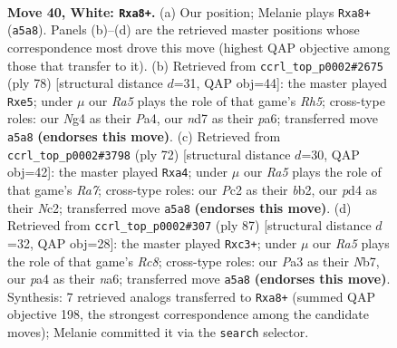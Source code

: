 \documentclass[11pt]{article}
\begin{document}
\clearpage

\begin{figure}[p]\centering
\begin{subfigure}{0.46\textwidth}\centering
\resizebox{\linewidth}{!}{%
\newchessgame
\chessboard[
  setfen={r5k1/1b1n4/8/R7/p2p2N1/P5P1/1PP5/2K5 w - - 2 40},
  showmover=false,
  pgfstyle=straightmove, color=movearrow, markmove={a5-a8}
]}
\caption{}
\end{subfigure}\hfill
\begin{subfigure}{0.46\textwidth}\centering
\resizebox{\linewidth}{!}{%
\newchessgame
\chessboard[
  setfen={8/7p/p2k4/4r2R/Pp6/6P1/5PP1/5K2 w - - 0 40},
  showmover=false,
  pgfstyle=straightmove, color=movearrow, markmove={h5-e5}
]}
\caption{}
\end{subfigure}
\\[4pt]
\begin{subfigure}{0.46\textwidth}\centering
\resizebox{\linewidth}{!}{%
\newchessgame
\chessboard[
  setfen={6k1/R7/3p2Bp/2nP4/r4p2/7P/1bN2PP1/5K2 w - - 2 37},
  showmover=false,
  pgfstyle=straightmove, color=movearrow, markmove={a7-a4}
]}
\caption{}
\end{subfigure}\hfill
\begin{subfigure}{0.46\textwidth}\centering
\resizebox{\linewidth}{!}{%
\newchessgame
\chessboard[
  setfen={8/1n2k1p1/N1p2p2/8/4PP2/2RK2P1/8/2r5 b - - 5 44},
  showmover=false,
  pgfstyle=straightmove, color=movearrow, markmove={c1-c3}
]}
\caption{}
\end{subfigure}
\caption{\textbf{Move 40, White: \texttt{Rxa8+}.} (a) Our position; Melanie plays \texttt{Rxa8+} (\texttt{a5a8}). Panels (b)--(d) are the retrieved master positions whose correspondence most drove this move (highest QAP objective among those that transfer to it). (b) Retrieved from \texttt{ccrl\_top\_p0002\#2675} (ply 78) [structural distance $d$=31, QAP obj=44]: the master played \texttt{Rxe5}; under $\mu$ our \emph{Ra5} plays the role of that game's \emph{Rh5}; cross-type roles: our \emph{N}g4 as their \emph{P}a4, our \emph{n}d7 as their \emph{p}a6; transferred move \texttt{a5a8} \textbf{(endorses this move)}. (c) Retrieved from \texttt{ccrl\_top\_p0002\#3798} (ply 72) [structural distance $d$=30, QAP obj=42]: the master played \texttt{Rxa4}; under $\mu$ our \emph{Ra5} plays the role of that game's \emph{Ra7}; cross-type roles: our \emph{P}c2 as their \emph{b}b2, our \emph{p}d4 as their \emph{N}c2; transferred move \texttt{a5a8} \textbf{(endorses this move)}. (d) Retrieved from \texttt{ccrl\_top\_p0002\#307} (ply 87) [structural distance $d$=32, QAP obj=28]: the master played \texttt{Rxc3+}; under $\mu$ our \emph{Ra5} plays the role of that game's \emph{Rc8}; cross-type roles: our \emph{P}a3 as their \emph{N}b7, our \emph{p}a4 as their \emph{n}a6; transferred move \texttt{a5a8} \textbf{(endorses this move)}. Synthesis: 7 retrieved analogs transferred to \texttt{Rxa8+} (summed QAP objective 198, the strongest correspondence among the candidate moves); Melanie committed it via the \texttt{search} selector.}
\label{fig:thought-m78}
\end{figure}
\end{document}
